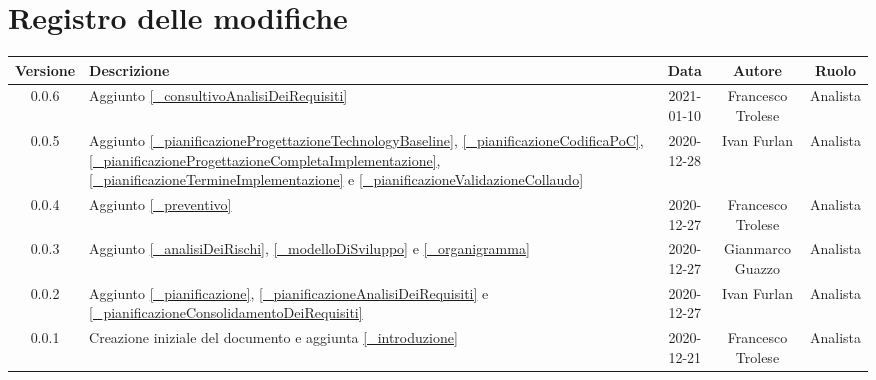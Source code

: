 \section*{Registro delle modifiche}

\begin{center}
	\begin{longtable}{|c|p{5cm}|c|c|c|}
		\hline
		\rowcolor{lighter-grayer}
		\textbf{Versione} & \textbf{Descrizione} & \textbf{Data} & \textbf{Autore} & \textbf{Ruolo} \\
		\hline
		\endfirsthead


		\hline
		0.0.6 & Aggiunto \ref{_consultivoAnalisiDeiRequisiti} & 2021-01-10 & Francesco Trolese & Analista\\
		0.0.5 & Aggiunto \ref{_pianificazioneProgettazioneTechnologyBaseline}, \ref{_pianificazioneCodificaPoC}, \ref{_pianificazioneProgettazioneCompletaImplementazione}, \ref{_pianificazioneTermineImplementazione} e \ref{_pianificazioneValidazioneCollaudo} & 2020-12-28 & Ivan Furlan & Analista\\
		0.0.4 & Aggiunto \ref{_preventivo} & 2020-12-27 & Francesco Trolese & Analista\\
		0.0.3 & Aggiunto \ref{_analisiDeiRischi}, \ref{_modelloDiSviluppo} e \ref{_organigramma} & 2020-12-27 & Gianmarco Guazzo & Analista\\
		0.0.2 & Aggiunto \ref{_pianificazione}, \ref{_pianificazioneAnalisiDeiRequisiti} e \ref{_pianificazioneConsolidamentoDeiRequisiti}& 2020-12-27 & Ivan Furlan & Analista\\
		0.0.1 & Creazione iniziale del documento e aggiunta \ref{_introduzione} & 2020-12-21 & Francesco Trolese & Analista\\
		\hline
	\end{longtable}
\end{center}